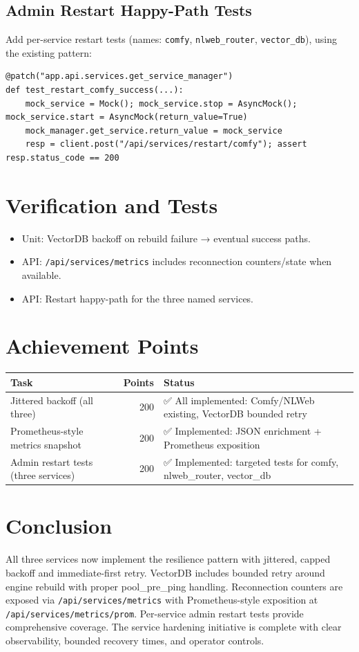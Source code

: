\documentclass[11pt]{article}
\begin{document}
\subsection{Admin Restart Happy-Path Tests}
Add per-service restart tests (names: \texttt{comfy}, \texttt{nlweb\_router}, \texttt{vector\_db}), using the existing pattern:
\begin{verbatim}
@patch("app.api.services.get_service_manager")
def test_restart_comfy_success(...):
    mock_service = Mock(); mock_service.stop = AsyncMock(); mock_service.start = AsyncMock(return_value=True)
    mock_manager.get_service.return_value = mock_service
    resp = client.post("/api/services/restart/comfy"); assert resp.status_code == 200
\end{verbatim}

\section{Verification and Tests}
\begin{itemize}
  \item Unit: VectorDB backoff on rebuild failure → eventual success paths.
  \item API: \texttt{/api/services/metrics} includes reconnection counters/state when available.
  \item API: Restart happy-path for the three named services.
\end{itemize}

\section{Achievement Points}
\begin{center}
\begin{tabular}{|l|r|l|}
\hline
\textbf{Task} & \textbf{Points} & \textbf{Status} \\
\hline
Jittered backoff (all three) & 200 & ✅ All implemented: Comfy/NLWeb existing, VectorDB bounded retry \\
Prometheus-style metrics snapshot & 200 & ✅ Implemented: JSON enrichment + Prometheus exposition \\
Admin restart tests (three services) & 200 & ✅ Implemented: targeted tests for comfy, nlweb\_router, vector\_db \\
\hline
\end{tabular}
\end{center}

\section{Conclusion}
All three services now implement the resilience pattern with jittered, capped backoff and immediate-first retry. VectorDB includes bounded retry around engine rebuild with proper pool\_pre\_ping handling. Reconnection counters are exposed via \texttt{/api/services/metrics} with Prometheus-style exposition at \texttt{/api/services/metrics/prom}. Per-service admin restart tests provide comprehensive coverage. The service hardening initiative is complete with clear observability, bounded recovery times, and operator controls.
\end{document}
